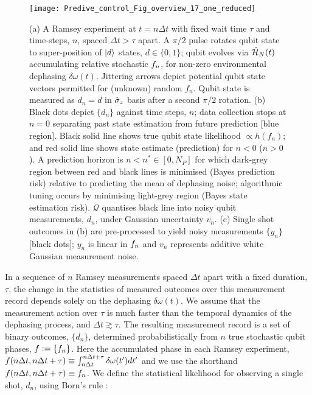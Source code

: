 \begin{figure}[h!]
    \texttt{[image: Predive\_control\_Fig\_overview\_17\_one\_reduced]} 
    \caption{ \label{fig:main:Predive_control_Fig_overview_17_one} (a) A Ramsey experiment at $t=n\Delta t$ with fixed wait time $\tau$ and time-steps, $n$, spaced $\Delta t > \tau$ apart. A $\pi/2$ pulse rotates qubit state to super-position of $| d \rangle$ states, $d\in \{0,1\}$; qubit evolves via $\hat{\mathcal{H}}_N(t)$ accumulating relative stochastic $f_n$, for non-zero environmental dephasing $\delta \omega (t)$. Jittering arrows depict potential qubit state vectors permitted for (unknown) random $f_n$. Qubit state is measured as $d_n=d$ in $\hat{\sigma}_{z}$ basis after a second $\pi/2$ rotation. (b) Black dots depict $\{d_n\}$ against time steps, $n$; data collection stops at $n=0$ separating past state estimation from future prediction [blue region].  Black solid line shows true qubit state likelihood $ \propto h(f_n)$; and  red solid line shows state estimate (prediction) for $n<0$ ($n>0$). A prediction horizon is $n < n^* \in [0,N_P]$ for which dark-grey region between red and black lines is minimised (Bayes prediction risk) relative to predicting the mean of dephasing noise; algorithmic tuning occurs by minimising light-grey region (Bayes state estimation risk). $\mathcal{Q}$ quantises black line into noisy qubit measurements, $d_n$, under Gaussian uncertainty $v_n$. (c) Single shot outcomes in (b) are pre-processed to yield noisy measurements $\{ y_n\}$ [black dots]; $y_n$ is linear in $f_n$ and $v_n$ represents additive white Gaussian measurement noise.}
\end{figure} 

In a sequence of $n$ Ramsey measurements spaced $\Delta t$ apart with a fixed duration, $\tau$, the change in the statistics of measured outcomes over this measurement record depends solely on the dephasing  $\delta \omega(t)$.   We assume that the measurement action over $\tau$ is much faster than the temporal dynamics of the dephasing process, and $\Delta t \gtrsim \tau$. The resulting measurement record is a set of binary outcomes,  $\{d_n\}$, determined probabilistically from $n$ true stochastic qubit phases, $f := \{f_n\}$. Here the accumulated phase in each Ramsey experiment, $ f(n \Delta t, n\Delta t + \tau) \equiv \int_{n \Delta t}^{n \Delta t +\tau} \delta \omega(t') dt'$ and we use the shorthand $f(n \Delta t , n\Delta t + \tau) \equiv f_n$.  We define the statistical likelihood for observing a single shot, $d_n$, using Born's rule \cite{ferrie2013}:

